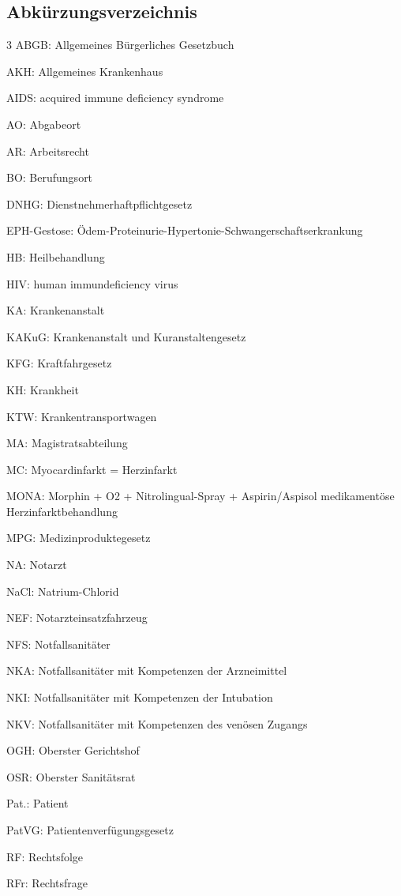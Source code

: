 \documentclass{article}
\begin{document}
\subsection{Abk\"urzungsverzeichnis}
\begin{multicols}{3}
ABGB:  Allgemeines B\"urgerliches Gesetzbuch

AKH:  Allgemeines Krankenhaus

AIDS:  acquired immune deficiency syndrome

AO:  Abgabeort

AR:  Arbeitsrecht

BO:  Berufungsort

DNHG:  Dienstnehmer\-haft\-pflicht\-gesetz

EPH-Gestose: 
\"Odem-Protein\-urie-Hypertonie-Schwanger\-schafts\-erkrankung

HB:  Heilbehandlung

HIV:  human immundeficiency virus

KA:  Krankenanstalt

KAKuG:  Krankenanstalt und Kur\-anstaltengesetz

KFG:  Kraftfahrgesetz

KH:  Krankheit

KTW:  Krankentransportwagen

MA:  Magistratsabteilung

MC:  Myocardinfarkt = Herz\-infarkt

MONA:  Morphin + O2 + Nitro\-lingual-Spray + Aspirin/Aspisol
medikament\"ose Herzinfarktbehandlung

MPG:  Medizinproduktegesetz

NA:  Notarzt

NaCl:  Natrium-Chlorid

NEF:  Notarzteinsatzfahrzeug

NFS:  Notfallsanit\"ater

NKA:  Notfallsanit\"ater mit Kompetenzen der Arzneimittel

NKI:  Notfallsanit\"ater mit Kompetenzen der Intubation

NKV:  Notfallsanit\"ater mit Kompetenzen des ven\"osen Zugangs

OGH:  Oberster Gerichtshof

OSR:  Oberster Sanit\"atsrat

Pat.:  Patient

PatVG:  Patienten\-ver\-f\"ugungs\-gesetz

RF:  Rechtsfolge

RFr:  Rechtsfrage


\end{multicols}
\end{document}
